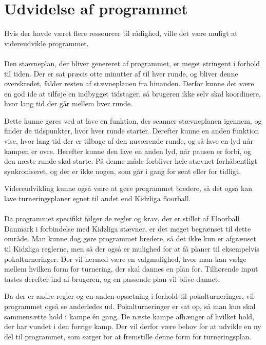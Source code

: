 \section{Udvidelse af programmet}
Hvis der havde været flere ressourcer til rådighed, ville det være muligt at videreudvikle programmet. 
\\\\
Den stævneplan, der bliver genereret af programmet, er meget stringent i forhold til tiden. Der er sat præcis otte minutter af til hver runde, og bliver denne overskredet, falder resten af stævneplanen fra hinanden. Derfor kunne det være en god ide at tilføje en indbygget tidstager, så brugeren ikke selv skal koordinere, hvor lang tid der går mellem hver runde. 
\par
Dette kunne gøres ved at lave en funktion, der scanner stævneplanen igennem, og finder de tidspunkter, hvor hver runde starter. Derefter kunne en anden funktion vise, hvor lang tid der er tilbage af den nuværende runde, og så lave en lyd når kampen er ovre. Herefter kunne den lave en anden lyd, når pausen er forbi, og den næste runde skal starte. På denne måde forbliver hele stævnet forhåbentligt synkroniseret, og der er ikke nogen, som går i gang for sent eller for tidligt.
\par
Videreudvikling kunne også være at gøre programmet bredere, så det også kan lave turneringsplaner egnet til andet end Kidzliga floorball.
\\\\
Da programmet specifikt følger de regler og krav, der er stillet af Floorball Danmark i forbindelse med Kidzliga stævner, er det meget begrænset til dette område. Man kunne dog gøre programmet bredere, så det ikke kun er afgrænset til Kidzliga reglerne, men så der også er mulighed for at få planer til eksempelvis pokalturneringer. Der vil hermed være en valgmulighed, hvor man kan vælge mellem hvilken form for turnering, der skal dannes en plan for. Tilhørende input tastes derefter ind af brugeren, og en passende plan vil blive dannet.
\par
Da der er andre regler og en anden opsætning i forhold til pokalturneringer, vil programmet også se anderledes ud. Pokalturneringer er sat op, så man kun skal sammensætte hold i kampe én gang. De næste kampe afhænger af hvilket hold, der har vundet i den forrige kamp. Der vil derfor være behov for at udvikle en ny del til programmet, som sørger for at fremstille denne form for turneringsplan. 
